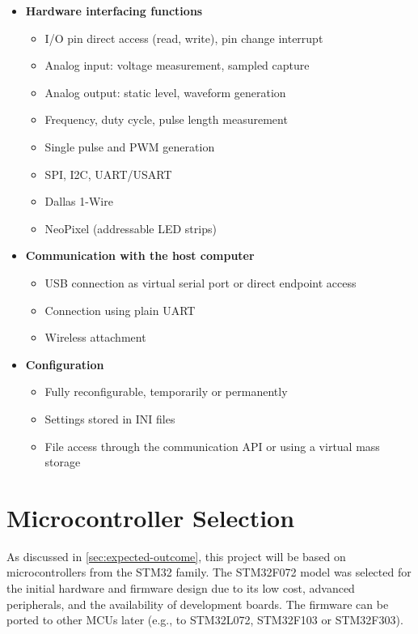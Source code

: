 \begin{itemize}
	\item \textbf{Hardware interfacing functions}
		\begin{itemize}
			\item I/O pin direct access (read, write), pin change interrupt
			\item Analog input: voltage measurement, sampled capture
			\item Analog output: static level, waveform generation
			\item Frequency, duty cycle, pulse length measurement
			\item Single pulse and \gls{PWM} generation
			\item \gls{SPI}, \gls{I2C}, \gls{UART}/\gls{USART}
			\item Dallas 1-Wire
			\item NeoPixel (addressable \gls{LED} strips)
		\end{itemize}
	\pagebreak[0]
	\item \textbf{Communication with the host computer}
		\begin{itemize}
			\item \gls{USB} connection as virtual serial port or direct endpoint access
			\item Connection using plain \gls{UART}
			\item Wireless attachment
		\end{itemize}
	\item \textbf{Configuration}
		\begin{itemize}
			\item Fully reconfigurable, temporarily or permanently
			\item Settings stored in INI files
			\item File access through the communication \gls{API} or using a virtual mass storage
		\end{itemize}
\end{itemize}

\section{Microcontroller Selection}

As discussed in \cref{sec:expected-outcome}, this project will be based on microcontrollers from the STM32 family. The STM32F072 model was selected for the initial hardware and firmware design due to its low cost, advanced peripherals, and the availability of development boards. The firmware can be ported to other \glspl{MCU} later (e.g., to STM32L072, STM32F103 or STM32F303).

